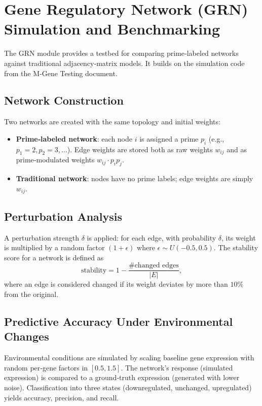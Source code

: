 \documentclass[12pt]{article}
\begin{document}
\section{Gene Regulatory Network (GRN) Simulation and Benchmarking}
\label{sec:grn}

The GRN module provides a testbed for comparing prime‑labeled networks against traditional adjacency‑matrix models. It builds on the simulation code from the M‑Gene Testing document.

\subsection{Network Construction}

Two networks are created with the same topology and initial weights:
\begin{itemize}
    \item \textbf{Prime‑labeled network}: each node $i$ is assigned a prime $p_i$ (e.g., $p_1=2, p_2=3,\dots$). Edge weights are stored both as raw weights $w_{ij}$ and as prime‑modulated weights $w_{ij} \cdot p_i p_j$.
    \item \textbf{Traditional network}: nodes have no prime labels; edge weights are simply $w_{ij}$.
\end{itemize}

\subsection{Perturbation Analysis}

A perturbation strength $\delta$ is applied: for each edge, with probability $\delta$, its weight is multiplied by a random factor $(1+\epsilon)$ where $\epsilon \sim U(-0.5,0.5)$. The stability score for a network is defined as
\[
\text{stability} = 1 - \frac{\text{\# changed edges}}{|E|},
\]
where an edge is considered changed if its weight deviates by more than $10\%$ from the original.

\subsection{Predictive Accuracy Under Environmental Changes}

Environmental conditions are simulated by scaling baseline gene expression with random per‑gene factors in $[0.5,1.5]$. The network’s response (simulated expression) is compared to a ground‑truth expression (generated with lower noise). Classification into three states (downregulated, unchanged, upregulated) yields accuracy, precision, and recall.
\end{document}
